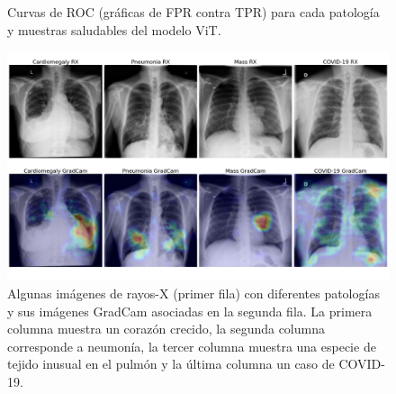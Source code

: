 \begin{figure}
    \begin{center}
    \end{center}
    \caption{Curvas de ROC (gráficas de FPR contra TPR) para cada patología y muestras saludables
             del modelo ViT.}
    \label{roc-curves-vit}
\end{figure}

\begin{figure}[ht!]
    \centering
    \includegraphics[width=0.8 \textwidth]{Chapters/4. ViT-Lung/images/vlgrid.png}
    \caption{Algunas imágenes de rayos-X (primer fila) con diferentes patologías y sus imágenes GradCam
             asociadas en la segunda fila. La primera columna muestra un corazón crecido, la segunda
             columna corresponde a neumonía, la tercer columna muestra una especie de tejido inusual
             en el pulmón y la última columna un caso de COVID-19.}
    \label{img-results}
\end{figure}

